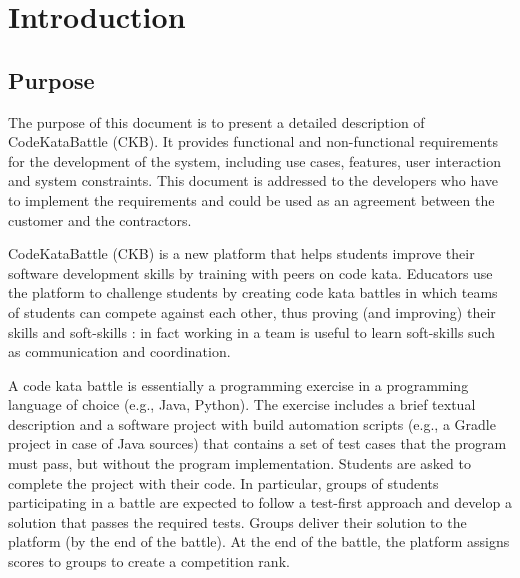 \chapter{Introduction}

\section{Purpose}
The purpose of this document is to present a detailed description of CodeKataBattle (CKB).
It provides functional and non-functional requirements for the development of the system, including use cases, features, user interaction and system constraints. This document is addressed to the developers who have to implement the requirements and
could be used as an agreement between the customer and the contractors.

CodeKataBattle (CKB) is a new platform that helps students improve their software development skills by training with peers on code kata. Educators use the platform to challenge students by creating code
kata battles in which teams of students can compete against each other, thus proving (and improving) their skills and soft-skills : in fact working in a team is useful to learn soft-skills such as
communication and coordination.

A code kata battle is essentially a programming exercise in a programming language of choice (e.g.,
Java, Python). The exercise includes a brief textual description and a software project with build
automation scripts (e.g., a Gradle project in case of Java sources) that contains a set of test cases that
the program must pass, but without the program implementation. Students are asked to complete the
project with their code. In particular, groups of students participating in a battle are expected to follow
a test-first approach and develop a solution that passes the required tests. Groups deliver their
solution to the platform (by the end of the battle). At the end of the battle, the platform assigns scores
to groups to create a competition rank.

